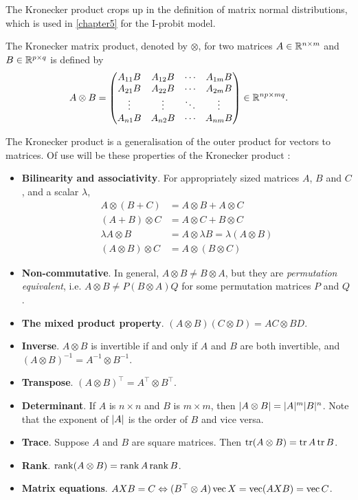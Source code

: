 The Kronecker product crops up in the definition of matrix normal distributions, which is used in \cref{chapter5} for the I-probit model.

\begin{definition}\label{def:kroneckerprod}
  The Kronecker matrix product, denoted by $\otimes$, for two matrices $A \in \mathbb{R}^{n\times m}$ and $B \in \mathbb{R}^{p\times q}$ is defined by
  \[
    A \otimes B = 
    \begin{pmatrix}
      A_{11}B &A_{12}B &\cdots &A_{1m}B \\
      A_{21}B &A_{22}B &\cdots &A_{2m}B \\    
      \vdots & \vdots &\ddots  &\vdots \\
      A_{n1}B &A_{n2}B &\cdots &A_{nm}B \\
    \end{pmatrix} \in \mathbb{R}^{np\times mq}.
  \]
\end{definition}

The Kronecker product is a generalisation of the outer product for vectors to matrices.
Of use will be these properties of the Kronecker product \citep{zhang2013kronecker}:
\begin{itemize}
  \item \textbf{Bilinearity and associativity}. For appropriately sized matrices $A$, $B$ and $C$, and a scalar $\lambda$,
  \begin{align*}
    A \otimes (B + C) &= A \otimes B + A \otimes C \\
    (A + B) \otimes C &= A \otimes C + B \otimes C \\
    \lambda A \otimes B &= A \otimes \lambda B = \lambda(A \otimes B) \\
    (A \otimes B) \otimes C &= A \otimes (B \otimes C)
  \end{align*}
  \item \textbf{Non-commutative}. In general, $A \otimes B \neq B \otimes A$, but they are \emph{permutation equivalent}, i.e. $A \otimes B \neq P(B \otimes A)Q$ for some permutation matrices $P$ and $Q$.
  \item \textbf{The mixed product property}. $(A \otimes B)(C \otimes D) = AC \otimes BD$.
  \item \textbf{Inverse}. $A \otimes B$ is invertible if and only if $A$ and $B$ are both invertible, and $(A \otimes B)^{-1} = A^{-1} \otimes B^{-1}$.
  \item \textbf{Transpose}. $(A \otimes B)^\top = A^\top \otimes B^\top$.
  \item \textbf{Determinant}. If $A$ is $n\times n$ and $B$ is $m \times m$, then $\lvert A \otimes B\rvert = \lvert A\rvert^m \lvert B\rvert^n$. Note that the exponent of $\lvert A\rvert$ is the order of $B$ and vice versa.
  \item \textbf{Trace}. Suppose $A$ and $B$ are square matrices. Then $\operatorname{tr} (A \otimes B) = \operatorname{tr} A \operatorname{tr} B$.
  \item \textbf{Rank}. $\operatorname{rank} (A \otimes B) = \operatorname{rank} A \operatorname{rank} B$.
  \item \textbf{Matrix equations}. $AXB = C \Leftrightarrow (B^\top \otimes A) \operatorname{vec} X = \operatorname{vec} (AXB) = \operatorname{vec} C$.
\end{itemize}

